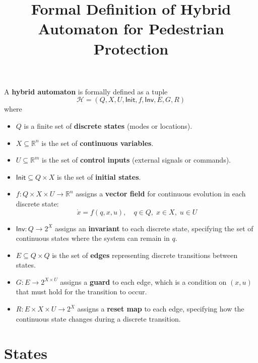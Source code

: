 \documentclass[12pt]{article}
\theoremstyle{definition}
\begin{document}
\title{Formal Definition of Hybrid Automaton for Pedestrian Protection}
\author{}
\date{}
\maketitle

A \textbf{hybrid automaton} is formally defined as a tuple
\[
\mathcal{H} = (Q, X, U, \mathsf{Init}, f, \mathsf{Inv}, E, G, R)
\]
where
\begin{itemize}
    \item $Q$ is a finite set of \textbf{discrete states} (modes or locations).
    \item $X \subseteq \mathbb{R}^n$ is the set of \textbf{continuous variables}.
    \item $U \subseteq \mathbb{R}^m$ is the set of \textbf{control inputs} (external signals or commands).
    \item $\mathsf{Init} \subseteq Q \times X$ is the set of \textbf{initial states}.
    \item $f: Q \times X \times U \to \mathbb{R}^n$ assigns a \textbf{vector field} for continuous evolution in each discrete state: 
    \[
    \dot{x} = f(q, x, u), \quad q \in Q, \; x \in X, \; u \in U
    \]
    \item $\mathsf{Inv}: Q \to 2^X$ assigns an \textbf{invariant} to each discrete state, specifying the set of continuous states where the system can remain in $q$.
    \item $E \subseteq Q \times Q$ is the set of \textbf{edges} representing discrete transitions between states.
    \item $G: E \to 2^{X \times U}$ assigns a \textbf{guard} to each edge, which is a condition on $(x, u)$ that must hold for the transition to occur.
    \item $R: E \times X \times U \to 2^X$ assigns a \textbf{reset map} to each edge, specifying how the continuous state changes during a discrete transition.
\end{itemize}


\section{States}
\end{document}
